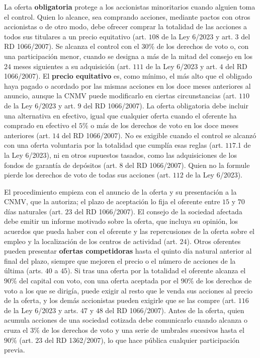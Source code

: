 \documentclass[10pt,a4paper]{article}
\begin{document}
La oferta \textbf{obligatoria} protege a los accionistas minoritarios cuando alguien toma el control. Quien lo alcance, sea comprando acciones, mediante pactos con otros accionistas o de otro modo, debe ofrecer comprar la totalidad de las acciones a todos sus titulares a un precio equitativo (art. $108$ de la Ley 6/2023 y art. $3$ del RD 1066/2007). Se alcanza el control con el $30\%$ de los derechos de voto o, con una participación menor, cuando se designa a más de la mitad del consejo en los $24$ meses siguientes a su adquisición (art. $111$ de la Ley 6/2023 y art. $4$ del RD 1066/2007). El \textbf{precio equitativo} es, como mínimo, el más alto que el obligado haya pagado o acordado por las mismas acciones en los doce meses anteriores al anuncio, aunque la CNMV puede modificarlo en ciertas circunstancias (art. $110$ de la Ley 6/2023 y art. $9$ del RD 1066/2007). La oferta obligatoria debe incluir una alternativa en efectivo, igual que cualquier oferta cuando el oferente ha comprado en efectivo el $5\%$ o más de los derechos de voto en los doce meses anteriores (art. $14$ del RD 1066/2007). No es exigible cuando el control se alcanzó con una oferta voluntaria por la totalidad que cumplía esas reglas (art. $117$.1 de la Ley 6/2023), ni en otros supuestos tasados, como las adquisiciones de los fondos de garantía de depósitos (art. $8$ del RD 1066/2007). Quien no la formule pierde los derechos de voto de todas sus acciones (art. $112$ de la Ley 6/2023).

El procedimiento empieza con el anuncio de la oferta y su presentación a la CNMV, que la autoriza; el plazo de aceptación lo fija el oferente entre $15$ y $70$ días naturales (art. $23$ del RD 1066/2007). El consejo de la sociedad afectada debe emitir un informe motivado sobre la oferta, que incluya su opinión, los acuerdos que pueda haber con el oferente y las repercusiones de la oferta sobre el empleo y la localización de los centros de actividad (art. $24$). Otros oferentes pueden presentar \textbf{ofertas competidoras} hasta el quinto día natural anterior al final del plazo, siempre que mejoren el precio o el número de acciones de la última (arts. $40$ a $45$). Si tras una oferta por la totalidad el oferente alcanza el $90\%$ del capital con voto, con una oferta aceptada por el $90\%$ de los derechos de voto a los que se dirigía, puede exigir al resto que le venda sus acciones al precio de la oferta, y los demás accionistas pueden exigirle que se las compre (art. $116$ de la Ley 6/2023 y arts. $47$ y $48$ del RD 1066/2007). Antes de la oferta, quien acumula acciones de una sociedad cotizada debe comunicarlo cuando alcanza o cruza el $3\%$ de los derechos de voto y una serie de umbrales sucesivos hasta el $90\%$ (art. $23$ del RD 1362/2007), lo que hace pública cualquier participación previa.
\end{document}
